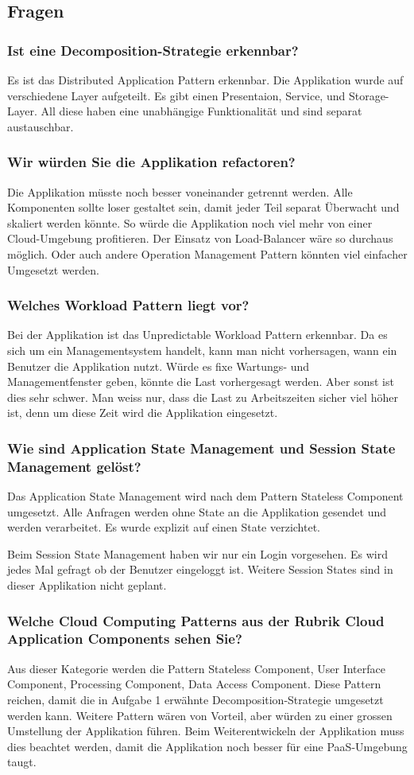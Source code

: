 \subsection{Fragen}
\subsubsection{Ist eine Decomposition-Strategie erkennbar?}
Es ist das Distributed Application Pattern erkennbar. Die Applikation wurde auf verschiedene Layer aufgeteilt. Es gibt einen Presentaion, Service, und Storage-Layer. All diese haben eine unabhängige Funktionalität und sind separat austauschbar. 
\subsubsection{Wir würden Sie die Applikation refactoren?}
Die Applikation müsste noch besser voneinander getrennt werden. Alle Komponenten sollte loser gestaltet sein, damit jeder Teil separat Überwacht und skaliert werden könnte. So würde die Applikation noch viel mehr von einer Cloud-Umgebung profitieren. Der Einsatz von Load-Balancer wäre so durchaus möglich. Oder auch andere Operation Management Pattern könnten viel einfacher Umgesetzt werden.
\subsubsection{Welches Workload Pattern liegt vor?}
Bei der Applikation ist das Unpredictable Workload Pattern erkennbar. Da es sich um ein Managementsystem handelt, kann man nicht vorhersagen, wann ein Benutzer die Applikation nutzt. Würde es fixe Wartungs- und Managementfenster geben, könnte die Last vorhergesagt werden. Aber sonst ist dies sehr schwer. Man weiss nur, dass die Last zu Arbeitszeiten sicher viel höher ist, denn um diese Zeit wird die Applikation eingesetzt.
\subsubsection{Wie sind Application State Management und Session State Management gelöst?}
Das Application State Management wird nach dem Pattern Stateless Component umgesetzt. Alle Anfragen werden ohne State an die Applikation gesendet und werden verarbeitet. Es wurde explizit auf einen State verzichtet.

Beim Session State Management haben wir nur ein Login vorgesehen. Es wird jedes Mal gefragt ob der Benutzer eingeloggt ist. Weitere Session States sind in dieser Applikation nicht geplant. 
\subsubsection{Welche Cloud Computing Patterns aus der Rubrik Cloud Application Components sehen Sie?}
Aus dieser Kategorie werden die Pattern Stateless Component, User Interface Component, Processing Component, Data Access Component. Diese Pattern reichen, damit die in Aufgabe 1 erwähnte Decomposition-Strategie umgesetzt werden kann. Weitere Pattern wären von Vorteil, aber würden zu einer grossen Umstellung der Applikation führen. Beim Weiterentwickeln der Applikation muss dies beachtet werden, damit die Applikation noch besser für eine PaaS-Umgebung taugt.
